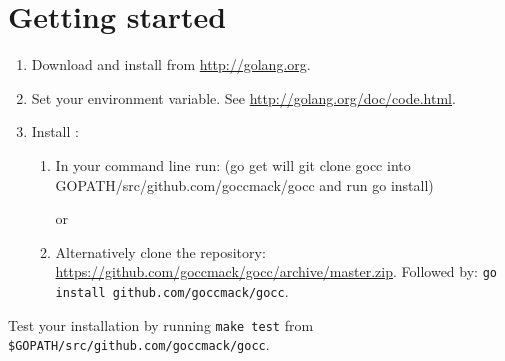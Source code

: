 \documentclass[12pt]{article}
\begin{document}
\section{Getting started}
	\begin{enumerate}
		\item Download and install \Go from \url{http://golang.org}.

		\item Set your  environment variable. See \url{http://golang.org/doc/code.html}.

		\item Install \gocc:
			\begin{enumerate}
				\item In your command line run:  (go get will git clone gocc into GOPATH/src/github.com/goccmack/gocc and run go install)

					or

				\item Alternatively clone the repository: \url{https://github.com/goccmack/gocc/archive/master.zip}. Followed by:
				\verb|go install github.com/goccmack/gocc|.
			\end{enumerate}

	\end{enumerate}

	Test your installation by running \verb|make test| from \verb|$GOPATH/src/github.com/goccmack/gocc|.
\end{document}
